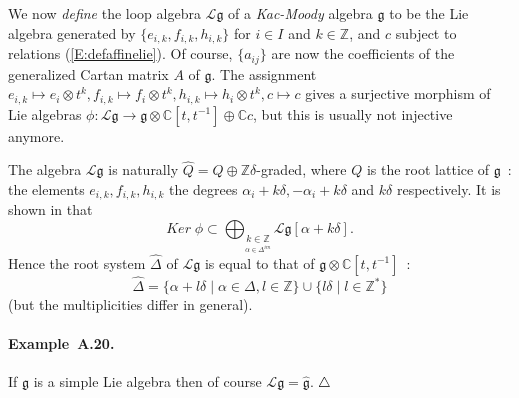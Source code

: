 \documentclass[a4paper,10pt]{amsart}
\def\Z{\mathbb{Z}}
\def\endexample{$\hfill \triangle$}
\def\a{\alpha}
\def\C{\mathbb{C}}
\def\g{\mathfrak{g}}
\numberwithin{equation}{section}
\begin{document}
{\vspace{.1in}

We now \textit{define} the loop algebra $\mathcal{L}\g$ of a \textit{Kac-Moody} algebra $\g$ to be the Lie algebra generated by $\{e_{i,k},f_{i,k},h_{i,k}\}$ for $i \in I$ and $k \in \Z$, and $c$ subject to relations (\ref{E:defaffinelie}). Of course, $\{a_{ij}\}$ are now the coefficients of the generalized Cartan matrix $A$ of $\g$.
The assignment $e_{i,k} \mapsto e_i \otimes t^k, f_{i,k} \mapsto f_i \otimes t^k, h_{i,k} \mapsto h_i\otimes t^k, c \mapsto c$ gives a surjective morphism of Lie algebras
$\phi:\mathcal{L}\g \to \g \otimes \C[t,t^{-1}] \oplus \C c$, but this is usually not injective anymore.

\vspace{.1in}

The algebra $\mathcal{L}\g$ is naturally $\widehat{Q}=Q \oplus \Z\delta$-graded, where $Q$ is the root lattice of $\g$~: the elements $e_{i,k},f_{i,k},h_{i,k}$ the degrees $\a_i+k\delta, -\a_i+k\delta$ and $k\delta$ respectively. It is shown in \cite{MRY} that
$${Ker}\;\phi \subset \bigoplus_{\underset{\a \in \Delta^{im}}{k \in \Z}} \mathcal{L}\g[\a+k\delta].$$
Hence the root system $\widehat{\Delta}$ of $\mathcal{L}\g$ is equal to that of $\g \otimes \C[t,t^{-1}]$~:
$$\widehat{\Delta}=\{\a+ l\delta\;|\; \a \in \Delta, l \in \Z\} \cup \{l\delta\;|\; l \in \Z^*\}$$
(but the multiplicities differ in general).

\vspace{.15in}

\addtocounter{theo}{1}

\paragraph{\textbf{Example~A.20.}} If $\g$ is a simple Lie algebra then of course $\mathcal{L}\g=\widehat{\g}$. \endexample

\vspace{.15in}

\addtocounter{theo}{1}

}
\end{document}
